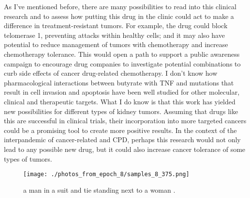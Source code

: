 \documentclass{article}%
\begin{document}
As I’ve mentioned before, there are many possibilities to read into this clinical research and to assess how putting this drug in the clinic could act to make a difference in treatment{-}resistant tumors. For example, the drug could block telomerase 1, preventing attacks within healthy cells; and it may also have potential to reduce management of tumors with chemotherapy and increase chemotherapy tolerance. This would open a path to support a public awareness campaign to encourage drug companies to investigate potential combinations to curb side effects of cancer drug{-}related chemotherapy.\newline%
I don’t know how pharmacological interactions between butyrate with TNF and mutations that result in cell invasion and apoptosis have been well studied for other molecular, clinical and therapeutic targets. What I do know is that this work has yielded new possibilities for different types of kidney tumors. Assuming that drugs like this are successful in clinical trials, their incorporation into more targeted cancers could be a promising tool to create more positive results. In the context of the interpandemic of cancer{-}related and CPD, perhaps this research would not only lead to any possible new drug, but it could also increase cancer tolerance of some types of tumors.\newline%

%


\begin{figure}[h!]%
\centering%
\texttt{[image: ./photos\_from\_epoch\_8/samples\_8\_375.png]}%
\caption{a man in a suit and tie standing next to a woman .}%
\end{figure}

%
\end{document}

